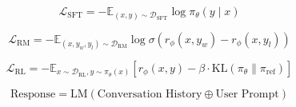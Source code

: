 
\begin{equation}
\mathcal{L}_{\text{SFT}} = -\mathbb{E}_{(x, y) \sim \mathcal{D}_{\text{SFT}}} \log \pi_{\theta}(y \mid x)
\end{equation}

\begin{equation}
\mathcal{L}_{\text{RM}} = -\mathbb{E}_{(x, y_w, y_l) \sim \mathcal{D}_{\text{RM}}}
\log \sigma\left( r_{\phi}(x, y_w) - r_{\phi}(x, y_l) \right)
\end{equation}

\begin{equation}
\mathcal{L}_{\text{RL}} = -\mathbb{E}_{x \sim \mathcal{D}_{\text{RL}}, y \sim \pi_{\theta}(x)}
\left[ r_{\phi}(x, y) - \beta \cdot \text{KL}\left( \pi_{\theta} \parallel \pi_{\text{ref}} \right) \right]
\end{equation}

\begin{equation}
\text{Response} = \text{LM}(\text{Conversation History} \oplus \text{User Prompt})
\end{equation}